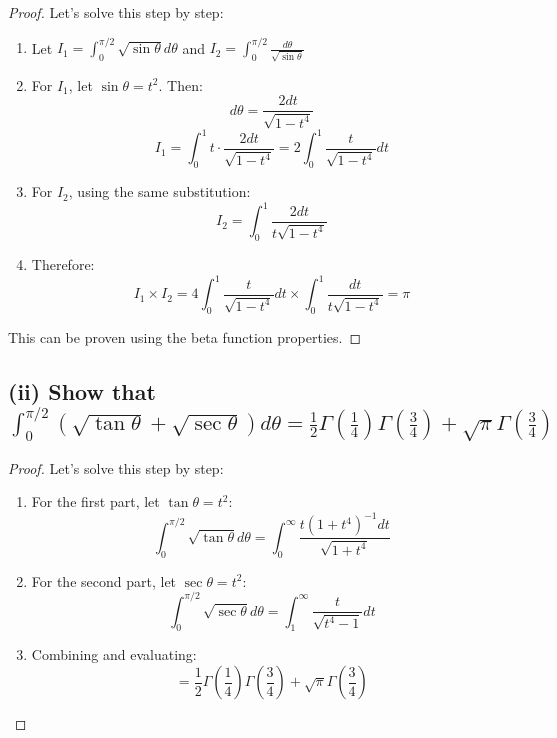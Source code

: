 \documentclass{article}
\begin{document}
\begin{proof}
Let's solve this step by step:

\begin{enumerate}
\item Let $I_1 = \int_0^{\pi/2} \sqrt{\sin \theta}d\theta$ and $I_2 = \int_0^{\pi/2} \frac{d\theta}{\sqrt{\sin \theta}}$

\item For $I_1$, let $\sin \theta = t^2$. Then:
\[ d\theta = \frac{2dt}{\sqrt{1-t^4}} \]
\[ I_1 = \int_0^1 t \cdot \frac{2dt}{\sqrt{1-t^4}} = 2\int_0^1 \frac{t}{\sqrt{1-t^4}}dt \]

\item For $I_2$, using the same substitution:
\[ I_2 = \int_0^1 \frac{2dt}{t\sqrt{1-t^4}} \]

\item Therefore:
\[ I_1 \times I_2 = 4\int_0^1 \frac{t}{\sqrt{1-t^4}}dt \times \int_0^1 \frac{dt}{t\sqrt{1-t^4}} = \pi \]
\end{enumerate}

This can be proven using the beta function properties.
\end{proof}

\subsection*{(ii) Show that $\int_0^{\pi/2} (\sqrt{\tan \theta} + \sqrt{\sec \theta})d\theta = \frac{1}{2}\Gamma(\frac{1}{4})\Gamma(\frac{3}{4}) + \sqrt{\pi}\Gamma(\frac{3}{4})$}

\begin{proof}
Let's solve this step by step:

\begin{enumerate}
\item For the first part, let $\tan \theta = t^2$:
\[ \int_0^{\pi/2} \sqrt{\tan \theta}d\theta = \int_0^\infty \frac{t(1+t^4)^{-1}dt}{\sqrt{1+t^4}} \]

\item For the second part, let $\sec \theta = t^2$:
\[ \int_0^{\pi/2} \sqrt{\sec \theta}d\theta = \int_1^\infty \frac{t}{\sqrt{t^4-1}}dt \]

\item Combining and evaluating:
\[ = \frac{1}{2}\Gamma(\frac{1}{4})\Gamma(\frac{3}{4}) + \sqrt{\pi}\Gamma(\frac{3}{4}) \]
\end{enumerate}
\end{proof}
\end{document}
